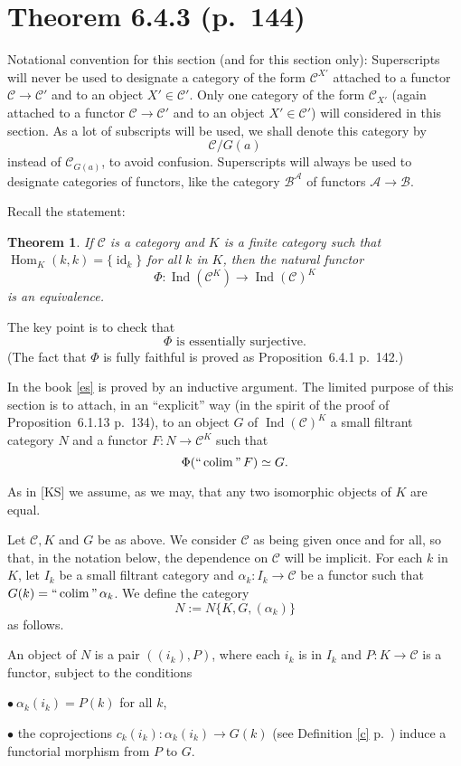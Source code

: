 \documentclass[12pt]{article}
\newtheorem{thm}{Theorem}
\theoremstyle{remark}
\theoremstyle{definition}
\newcommand{\bu}{\bullet}
\newcommand{\n}{\noindent}
\newcommand{\A}{\mathcal A}
\newcommand{\B}{\mathcal B}
\newcommand{\C}{\mathcal C}
\newcommand{\be}{\begin{equation}}
\newcommand{\ee}{\end{equation}}
\newcommand{\pr}{Proposition}
\DeclareMathOperator*{\coli}{colim}
\DeclareMathOperator*{\ic}{``\coli"}
\DeclareMathOperator{\id}{id}
\DeclareMathOperator{\h}{Hom}
\DeclareMathOperator{\Ind}{Ind}
\begin{document}
\section{Theorem 6.4.3 (p.~144)} %
% 
Notational convention for this section (and for this section only): Superscripts will never be used to designate a category of the form $\C^{X'}$ attached to a functor $\C\to\C'$ and to an object $X'\in\C'$. Only one category of the form $\C_{X'}$ (again attached to a functor $\C\to\C'$ and to an object $X'\in\C'$) will considered in this section. As a lot of subscripts will be used, we shall denote this category by 
%
\be\label{slice}
\C/G(a)
\ee
%
instead of $\C_{G(a)}$, to avoid confusion. Superscripts will always be used to designate categories of functors, like the category $\B^\A$ of functors $\A\to\B$. 

Recall the statement: 
%
\begin{thm}
If $\C$ is a category and $K$ is a finite category such that $\h_K(k,k)=\{\id_k\}$ for all $k$ in $K$, then the natural functor 
$$
\Phi:\Ind(\C^K)\to\Ind(\C)^K
$$ 
is an equivalence.
\end{thm}
%

The key point is to check that 
%
\be\label{es} 
\Phi\text{ is essentially surjective.} 
\ee 
%
(The fact that $\Phi$ is fully faithful is proved as \pr\ 6.4.1 p.~142.) 

In the book \eqref{es} is proved by an inductive argument. The limited purpose of this section is to attach, in an ``explicit'' way (in the spirit of the proof of \pr\ 6.1.13 p.~134), to an object $G$ of $\Ind(\C)^K$ a small filtrant category $N$ and a functor $F:N\to\C^K$ such that 
$$ 
\Phi(\ic F)\simeq G. 
$$ 

As in [KS] we assume, as we may, that any two isomorphic objects of $K$ are equal. 

Let $\C,K$ and $G$ be as above. We consider $\C$ as being given once and for all, so that, in the notation below, the dependence on $\C$ will be implicit. For each $k$ in $K$, let $I_k$ be a small filtrant category and $\alpha_k:I_k\to\C$ be a functor such that $G(k)=\ic\alpha_k$. We define the category 
$$
N:=N\{K,G,(\alpha_k)\}
$$ 
as follows. 

An object of $N$ is a pair $((i_k),P)$, where each $i_k$ is in $I_k$ and $P:K\to\C$ is a functor, subject to the conditions 

\n$\bu\ \alpha_k(i_k)=P(k)$ for all $k$, 

\n$\bu$ the coprojections $c_k(i_k):\alpha_k(i_k)\to G(k)$ (see Definition \ref{c} p.~\pageref{c}) induce a functorial morphism from $P$ to $G$. 
\end{document}

